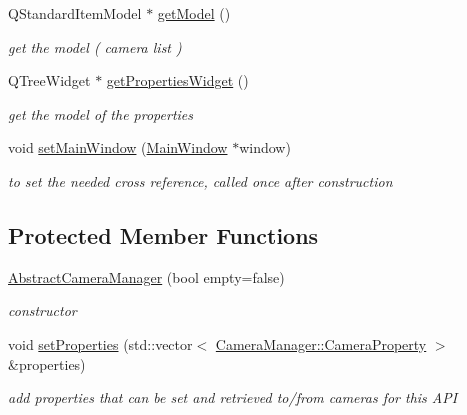 \begin{DoxyCompactItemize}
\item 
Q\-Standard\-Item\-Model $\ast$ \hyperlink{class_abstract_camera_manager_a02097102061955f0092969a6cf812823}{get\-Model} ()
\begin{DoxyCompactList}\small\item\em get the model ( camera list ) \end{DoxyCompactList}\item 
Q\-Tree\-Widget $\ast$ \hyperlink{class_abstract_camera_manager_a8cfcc9f2156936f1d8faea55ad97eeab}{get\-Properties\-Widget} ()
\begin{DoxyCompactList}\small\item\em get the model of the properties \end{DoxyCompactList}\item 
void \hyperlink{class_abstract_camera_manager_a9369df77518a91e24596d2bbe3436bab}{set\-Main\-Window} (\hyperlink{class_main_window}{Main\-Window} $\ast$window)
\begin{DoxyCompactList}\small\item\em to set the needed cross reference, called once after construction \end{DoxyCompactList}\end{DoxyCompactItemize}
\subsection*{Protected Member Functions}
\begin{DoxyCompactItemize}
\item 
\hyperlink{class_abstract_camera_manager_a23be9d93959d992c91efcf1416c597ef}{Abstract\-Camera\-Manager} (bool empty=false)
\begin{DoxyCompactList}\small\item\em constructor \end{DoxyCompactList}\item 
void \hyperlink{class_abstract_camera_manager_ac5c7ff3b69138df82efafa0400b50ce5}{set\-Properties} (std\-::vector$<$ \hyperlink{class_camera_manager_1_1_camera_property}{Camera\-Manager\-::\-Camera\-Property} $>$ \&properties)
\begin{DoxyCompactList}\small\item\em add properties that can be set and retrieved to/from cameras for this A\-P\-I \end{DoxyCompactList}\end{DoxyCompactItemize}



